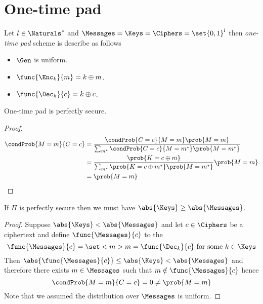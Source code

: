  \section{One-time pad}
Let \(l \in \Naturals^{\ast}\) and \(\Messages = \Keys = \Ciphers = \set{0,1}^{l}\) then \textit{one-time pad} scheme is describe as follows 
\begin{itemize}
    \item \(\Gen\) is uniform.
    \item \(\func{\Enc_k}{m} = k \oplus m\).
    \item \(\func{\Dec_k}{c} = k \oplus c\).
\end{itemize}

\begin{theorem}
    One-time pad is perfectly secure.
\end{theorem}

\begin{proof}
    \begin{align*}
        \condProb{M = m }{C = c} &= \dfrac{\condProb{C = c}{M = m} \prob{M = m}}{\sum_{m^{\ast}} \condProb{C = c}{M = m^{\ast}} \prob{M = m^{\ast}}}\\
        &= \dfrac{\prob{K = c \oplus m}}{\sum_{m^{\ast}} \prob{K = c \oplus m^{\ast}} \prob{M = m^{\ast}}} \prob{M = m}\\
        &= \prob{M = m}
    \end{align*}
\end{proof}

\begin{proposition}
    If \(\Pi\) is perfectly secure then we must have \(\abs{\Keys} \geq \abs{\Messages}\).
\end{proposition}

\begin{proof}
    Suppose \(\abs{\Keys} < \abs{\Messages}\) and let \(c \in \Ciphers\) be a ciphertext and define \(\func{\Messages}{c}\) to the 
    \begin{equation*}
        \func{\Messages}{c} = \set<m>{m = \func{\Dec_k}{c} \ \text{for some}\ k \in \Keys }
    \end{equation*}
    Then \(\abs{\func{\Messages}{c}} \leq \abs{\Keys} < \abs{\Messages}\) and therefore there exists \(m \in \Messages\) such that \(m \notin \func{\Messages}{c}\) hence 
    \begin{equation*}
        \condProb{M = m}{C = c} = 0 \neq \prob{M = m}
    \end{equation*}
    Note that we assumed the distribution over \(\Messages\) is uniform.
\end{proof}

